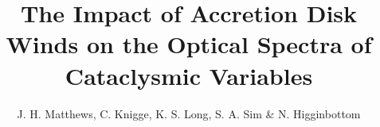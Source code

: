 \documentclass[preprint, a4paper, 11pt]{aastex}
\begin{document}

\renewcommand{\labelitemi}{$\bullet$}
\def\py{\textsc{Python} }
\def\tar{\textsc{Tardis} }
\def\cld{\textsc{Cloudy} }
\def\civ{C~\textsc{iv} }
\def\araa{ARAA}
\def\nat{Nature}
\def\apjl{ApJ Letters}
\def\aapr{AAPR}
\def\actaa{ACTAA} 
\def\ssr{SSR}
\def\apj{ApJ}
\def\apss{AP\&SS}
\def\pasp{PASP}
\def\aap{A\&A}
\def\mnras{MNRAS}
\def\aj{AJ}
\def\rmxaa{RMXAA}

\def\heiiopt{He~\textsc{ii}~$\lambda4686{\rm \AA}$}
\def\heiiuv{He~\textsc{ii}~$\lambda1640{\rm \AA}$}
\def\heiioptnew{He~\textsc{ii}~$\lambda3202{\rm \AA}$}
\def\la{Ly-$\alpha$}
\def\ha{H$\alpha$}
\def\hb{H$\beta$}
\def\civfull{C~\textsc{iv}~$\lambda1550{\rm \AA}$}

%
%


\title{The Impact of Accretion Disk Winds on the Optical Spectra of Cataclysmic Variables}
\author{J. H. Matthews, C. Knigge, K. S. Long, S. A. Sim \& N. Higginbottom}


%
%
\end{document}
